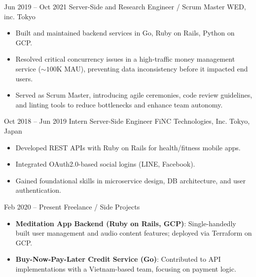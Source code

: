 \documentclass[11pt,letterpaper]{moderncv}
\begin{document}
\cventry
    {Jun 2019 -- Oct 2021}
    {Server-Side and Research Engineer / Scrum Master}
    {WED, inc.}
    {Tokyo}
    {}
    {
      \begin{itemize}
        \item Built and maintained backend services in Go, Ruby on Rails, Python on GCP.
        \item Resolved critical concurrency issues in a high-traffic money management service ($\sim100\mathrm{K}$ MAU), preventing data inconsistency before it impacted end users.
        \item Served as Scrum Master, introducing agile ceremonies, code review guidelines, and linting tools to reduce bottlenecks and enhance team autonomy.
      \end{itemize}
    }

\cventry
    {Oct 2018 -- Jun 2019}
    {Intern Server-Side Engineer}
    {FiNC Technologies, Inc.}
    {Tokyo, Japan}
    {}
    {
      \begin{itemize}
        \item Developed REST APIs with Ruby on Rails for health/fitness mobile apps.
        \item Integrated OAuth2.0-based social logins (LINE, Facebook).
        \item Gained foundational skills in microservice design, DB architecture, and user authentication.
      \end{itemize}
    }

\cventry
    {Feb 2020 -- Present}
    {Freelance / Side Projects}
    {}
    {}
    {}
    {
      \begin{itemize}
        \item \textbf{Meditation App Backend (Ruby on Rails, GCP)}:
        Single-handedly built user management and audio content features; deployed via Terraform on GCP.
        \item \textbf{Buy-Now-Pay-Later Credit Service (Go)}:
        Contributed to API implementations with a Vietnam-based team, focusing on payment logic.
      \end{itemize}
    }

\end{document}
